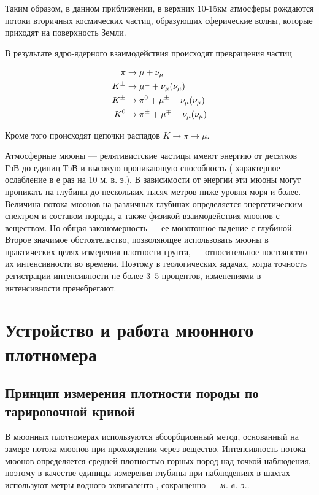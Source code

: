 Таким образом, в данном приближении, в верхних 10-15км атмосферы рождаются потоки вторичных космических частиц, образующих сферические волны, которые приходят на поверхность Земли.

В результате ядро-ядерного взаимодействия происходят превращения частиц

\begin{equation}
\begin{split}
	\pi &\to \mu + \nu_\mu \\
	K^\pm &\to \mu^\pm + \nu_\mu (\-{\nu_\mu}) \\
	K^\pm &\to \pi^0 + \mu^\pm + \nu_\mu (\-{\nu_\mu}) \\
	K^0 &\to \pi^\pm + \mu^\mp + \nu_\mu (\-{\nu_\mu}) 
\end{split}
\end{equation}

Кроме того происходят цепочки распадов $K \to \pi \to \mu$.


Атмосферные мюоны --- релятивистские частицы имеют энергию от десятков ГэВ до единиц ТэВ и высокую проникающую способность ( характерное ослабление в е раз на 10 м. в. э.). 
В зависимости от энергии эти мюоны могут проникать на глубины 
до нескольких тысяч метров ниже уровня моря и более. Величина 
потока мюонов на различных глубинах определяется 
энергетическим спектром и составом породы, а также физикой взаимодействия мюонов с веществом. Но общая 
закономерность --- ее монотонное падение с глубиной. 
Второе значимое обстоятельство, позволяющее использовать мюоны 
в практических целях измерения плотности грунта, --- относительное 
постоянство их интенсивности во времени. Поэтому 
в геологических задачах, когда точность регистрации 
интенсивности не более 3--5 процентов,  
изменениями в интенсивности пренебрегают.

\section{Устройство и работа мюонного плотномера}\label{sect1_3}

\subsection{Принцип измерения плотности породы по тарировочной кривой}\label{subsect1_3_1}

В мюонных плотномерах используются абсорбционный метод, 
основанный на замере потока мюонов при прохождении
через вещество. Интенсивность потока мюонов определяется 
средней плотностью горных пород над точкой наблюдения, 
поэтому в качестве единицы измерения глубины 
при наблюдениях в шахтах используют метры водного эквивалента
, сокращенно --- \textit{м. в. э.}. 

